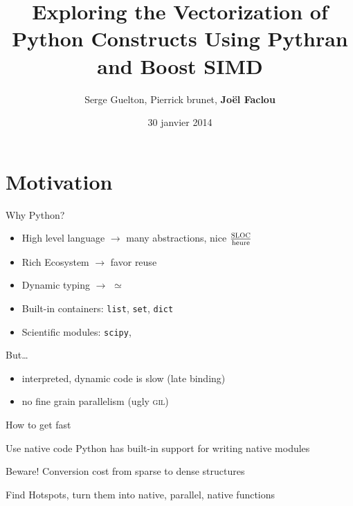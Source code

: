 \documentclass[serif]{beamer} %
\author[Joël Falcou]{Serge Guelton, Pierrick brunet, \textbf{Joël Faclou}}
\title[\texttt{pythran}]{Exploring the Vectorization of Python Constructs Using Pythran and Boost SIMD}
\date{30 janvier 2014}
\institute{QuarksLab / INRIA / LRI}
\begin{document}
\begin{frame}
\maketitle
\end{frame}

\section{Motivation}
\begin{frame}{Why Python?}

  \begin{itemize}
      \item High level language $\rightarrow$ many abstractions, nice $\frac{\textsc{SLOC}}{\text{heure}}$
      \item Rich Ecosystem $\rightarrow$ favor reuse
      \item Dynamic typing $\rightarrow$ $\simeq$
      \item Built-in containers: \texttt{list}, \texttt{set}, \texttt{dict}
      \item Scientific modules: \texttt{scipy}, 
  \end{itemize}
  \begin{center}
  \end{center}
  \begin{center}
	\alert{But\dots}
  \end{center}
  \begin{itemize}
      \item interpreted, dynamic code is slow (\frownie late binding)
      \item no fine grain parallelism (ugly \textsc{gil})
  \end{itemize}

\end{frame}

\begin{frame}{How to get fast}
  \begin{block}{Use native code}
      Python has built-in support for writing native modules
  \end{block}

  \begin{block}{Beware!}
      Conversion cost from sparse to dense structures
  \end{block}
  \begin{center}
      Find Hotspots, turn them into native, parallel,  native functions
  \end{center}
\end{frame}
\end{document}
